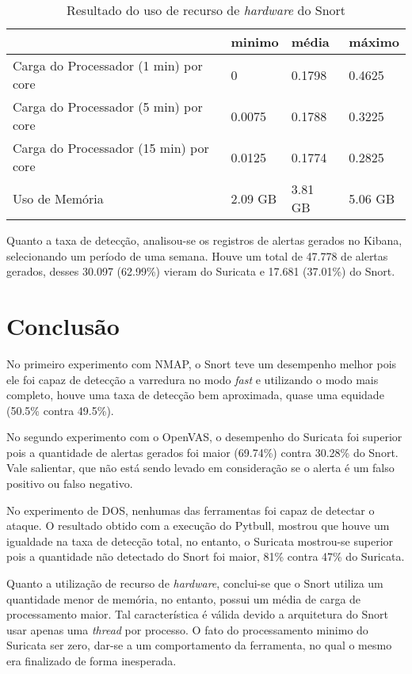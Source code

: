 \begin{table}[!htb]
\ABNTEXfontereduzida
\centering
\caption{Resultado do uso de recurso de \textit{hardware} do Snort}
\label{tab:snort-recursos}
\begin{tabular}{|M{5cm}|M{2cm}|M{2cm}|M{2cm}|}
    \hline
     & \textbf{minimo} & \textbf{média} & \textbf{máximo} \\
    \hline
    Carga do Processador (1 min) por core & 0 & 0.1798 & 0.4625 \\
    \hline
    Carga do Processador (5 min) por core & 0.0075 & 0.1788 & 0.3225 \\
    \hline
    Carga do Processador (15 min) por core & 0.0125 & 0.1774 & 0.2825 \\
    \hline
    Uso de Memória & 2.09 GB & 3.81 GB & 5.06 GB \\
    \hline
\end{tabular}
\end{table}

Quanto a taxa de detecção, analisou-se os registros de alertas gerados no Kibana, selecionando um período de uma semana. Houve um total de 47.778 de alertas gerados, desses 30.097 (62.99\%) vieram do Suricata e 17.681 (37.01\%) do Snort.

\section{Conclusão} \label{sec:conclusão}

No primeiro experimento com NMAP, o Snort teve um desempenho melhor pois ele foi capaz de detecção a varredura no modo \textit{fast} e utilizando o modo mais completo, houve uma taxa de detecção bem aproximada, quase uma equidade (50.5\% contra 49.5\%). 

No segundo experimento com o OpenVAS, o desempenho do Suricata foi superior pois a quantidade de alertas gerados foi maior (69.74\%) contra 30.28\% do Snort. Vale salientar, que não está sendo levado em consideração se o alerta é um falso positivo ou falso negativo.  

No experimento de DOS, nenhumas das ferramentas foi capaz de detectar o ataque. O resultado obtido com a execução do Pytbull, mostrou que houve um igualdade na taxa de detecção total, no entanto, o Suricata mostrou-se superior pois a quantidade não detectado do Snort foi maior, 81\% contra 47\% do Suricata.

Quanto a utilização de recurso de \textit{hardware}, conclui-se que o Snort utiliza um quantidade menor de memória, no entanto, possui um média de carga de processamento maior. Tal característica é válida devido a arquitetura do Snort usar apenas uma \textit{thread} por processo. O fato do processamento minimo do Suricata ser zero, dar-se a um comportamento da ferramenta, no qual o mesmo era finalizado de forma inesperada.  

